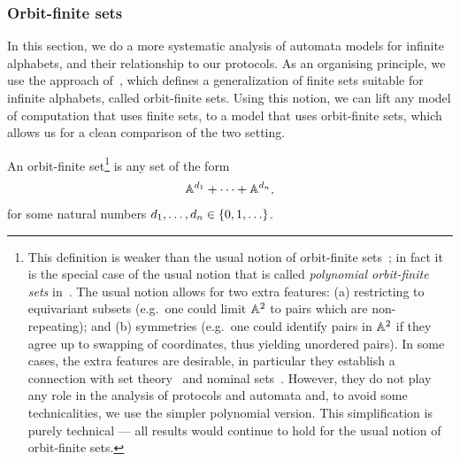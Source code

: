 \subsubsection{Orbit-finite sets}
\label{sec:orbit-finite-sets}
In this section, we do a more systematic analysis of automata models for infinite alphabets, and their relationship to our protocols. As an organising principle, we use the approach of~\cite{bojanczykOrbitFiniteSetsTheir2017}, which defines a generalization of finite sets
suitable for infinite alphabets, called orbit-finite sets. Using this notion, we can lift any model of computation that uses finite sets, to a model that uses orbit-finite sets, which allows us for a clean comparison of the two setting.
\begin{definition} \label{def:orbit-finite-sets}
    An orbit-finite set\footnote{
This definition is weaker than the usual notion of orbit-finite sets~\cite[Section 5]{bojanczyk_slightly}; in fact it is the special case of the usual notion that is called \emph{polynomial orbit-finite sets} in~\cite[Section 1]{bojanczyk_slightly}.
The usual notion  allows for two extra features: (a) restricting to equivariant subsets (e.g.~one could limit $\mathbb A^2$ to pairs which are non-repeating); and (b)  symmetries (e.g.~one could identify pairs in $\mathbb A^2$ if they agree up to swapping of coordinates, thus yielding unordered pairs). In some cases, the extra features are desirable, in particular they establish a connection with set theory~\cite{blassDedekind2016} and  nominal sets~\cite[Section 5]{PittsAM:nomsns}. However, they do not play any role in the analysis of protocols and automata and, to avoid some technicalities, we use the simpler polynomial version. This simplification is purely technical --- all results would continue to hold for the usual notion of orbit-finite sets.
} is any set of the form 
    \begin{align*}
    \mathbb A^{d_1} + \cdots + \mathbb A^{d_n},
    \end{align*}
    for some natural numbers $d_1,\ldots,d_n \in \{0,1,\ldots\}$. 
\end{definition}


